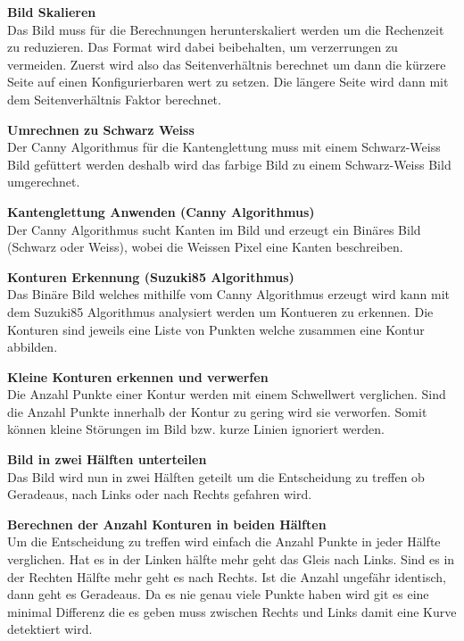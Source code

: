 \documentclass[../../main.tex]{subfiles}
\begin{document}
\textbf{Bild Skalieren}\\
Das Bild muss für die Berechnungen herunterskaliert werden um die Rechenzeit zu reduzieren. Das Format
wird dabei beibehalten, um verzerrungen zu vermeiden. Zuerst wird also das Seitenverhältnis berechnet um dann
die kürzere Seite auf einen Konfigurierbaren wert zu setzen. Die längere Seite wird dann mit dem Seitenverhältnis Faktor
berechnet.

\textbf{Umrechnen zu Schwarz Weiss}\\
Der Canny Algorithmus für die Kantenglettung muss mit einem Schwarz-Weiss Bild gefüttert werden deshalb wird das farbige Bild
zu einem Schwarz-Weiss Bild umgerechnet.

\textbf{Kantenglettung Anwenden (Canny Algorithmus)}\\
Der Canny Algorithmus sucht Kanten im Bild und erzeugt ein Binäres Bild (Schwarz oder Weiss), wobei die Weissen Pixel eine Kanten
beschreiben.

\textbf{Konturen Erkennung (Suzuki85 Algorithmus)}\\
Das Binäre Bild welches mithilfe vom Canny Algorithmus erzeugt wird kann mit dem Suzuki85 Algorithmus analysiert werden um Kontueren zu erkennen.
Die Konturen sind jeweils eine Liste von Punkten welche zusammen eine Kontur abbilden.

\textbf{Kleine Konturen erkennen und verwerfen}\\
Die Anzahl Punkte einer Kontur werden mit einem Schwellwert verglichen. Sind die Anzahl Punkte innerhalb der Kontur zu gering wird sie verworfen.
Somit können kleine Störungen im Bild bzw. kurze Linien ignoriert werden.

\textbf{Bild in zwei Hälften unterteilen}\\
Das Bild wird nun in zwei Hälften geteilt um die Entscheidung zu treffen ob Geradeaus, nach Links oder nach Rechts gefahren wird.

\textbf{Berechnen der Anzahl Konturen in beiden Hälften}\\
Um die Entscheidung zu treffen wird einfach die Anzahl Punkte in jeder Hälfte verglichen. Hat es in der Linken hälfte mehr geht das Gleis nach Links.
Sind es in der Rechten Hälfte mehr geht es nach Rechts. Ist die Anzahl ungefähr identisch, dann geht es Geradeaus. Da es nie genau viele Punkte haben wird
git es eine minimal Differenz die es geben muss zwischen Rechts und Links damit eine Kurve detektiert wird.
\end{document}
